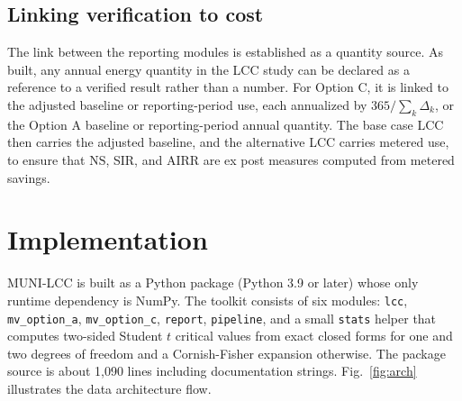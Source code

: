 \documentclass[10pt,twocolumn,letterpaper]{article}
\newcommand{\code}[1]{\texttt{#1}}
\begin{document}
\subsection{Linking verification to cost}\label{sec:link}

The link between the reporting modules is established as a quantity source. As built, any annual energy quantity in the LCC study can be declared as a reference to a verified result rather than a number. For Option C, it is linked to the adjusted baseline or reporting-period use, each annualized by $365/\sum_k\Delta_k$, or the Option A baseline or reporting-period annual quantity. The base case LCC then carries the adjusted baseline, and the alternative LCC carries metered use, to ensure that $\mathrm{NS}$, SIR, and AIRR are ex post measures computed from metered savings.

\section{Implementation}\label{sec:impl}

MUNI-LCC is built as a Python package (Python 3.9 or later) whose only runtime dependency is NumPy. The toolkit consists of six modules: \code{lcc}, \code{mv\_option\_a}, \code{mv\_option\_c}, \code{report}, \code{pipeline}, and a small \code{stats} helper that computes two-sided Student $t$ critical values from exact closed forms for one and two degrees of freedom and a Cornish-Fisher expansion otherwise. The package source is about 1,090 lines including documentation strings. Fig.~\ref{fig:arch} illustrates the data architecture flow.
\end{document}
